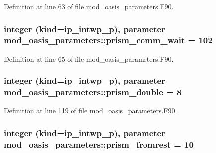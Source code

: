 Definition at line 63 of file mod\+\_\+oasis\+\_\+parameters.\+F90.

\hypertarget{classmod__oasis__parameters_a3d0349d8815bf1848122d99993097842}{
\subsubsection[{prism\+\_\+comm\+\_\+wait}]{\setlength{\rightskip}{0pt plus 5cm}integer (kind=ip\+\_\+intwp\+\_\+p), parameter mod\+\_\+oasis\+\_\+parameters\+::prism\+\_\+comm\+\_\+wait = 102}}\label{classmod__oasis__parameters_a3d0349d8815bf1848122d99993097842}


Definition at line 65 of file mod\+\_\+oasis\+\_\+parameters.\+F90.

\hypertarget{classmod__oasis__parameters_a9527d2d640ea7d747143bf994ee9b206}{
\subsubsection[{prism\+\_\+double}]{\setlength{\rightskip}{0pt plus 5cm}integer (kind=ip\+\_\+intwp\+\_\+p), parameter mod\+\_\+oasis\+\_\+parameters\+::prism\+\_\+double = 8}}\label{classmod__oasis__parameters_a9527d2d640ea7d747143bf994ee9b206}


Definition at line 119 of file mod\+\_\+oasis\+\_\+parameters.\+F90.

\hypertarget{classmod__oasis__parameters_ad77e6f35280cf4e306f818f9ec815441}{
\subsubsection[{prism\+\_\+fromrest}]{\setlength{\rightskip}{0pt plus 5cm}integer (kind=ip\+\_\+intwp\+\_\+p), parameter mod\+\_\+oasis\+\_\+parameters\+::prism\+\_\+fromrest = 10}}\label{classmod__oasis__parameters_ad77e6f35280cf4e306f818f9ec815441}


